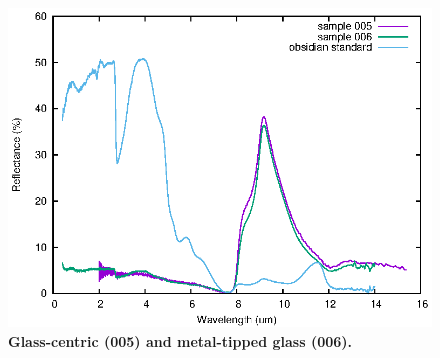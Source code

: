\documentclass[10pt,twoside,openany]{article}
\theoremstyle{definition}
\begin{document}
\begin{figure}
  \includegraphics[angle=0,width=1.0\textwidth]{005-006.eps}
  \caption{\label{fig:005-006}\textbf{Glass-centric (005) and metal-tipped glass (006).}}
\end{figure}
\end{document}

